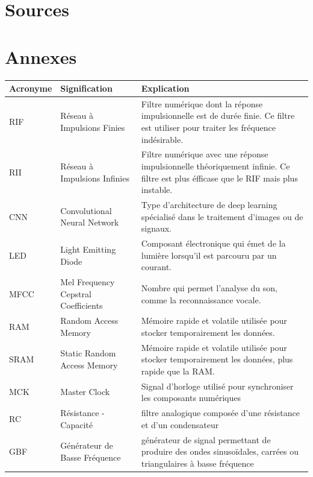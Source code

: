 \documentclass[a4paper,11pt]{article}
\begin{document}
\newpage	
\section{Sources}


\newpage

\section{Annexes}
\begin{table}[H]
\centering
\begin{tabular}{|l|p{4cm}|p{8cm}|}
\hline
\textbf{Acronyme} & \textbf{Signification} & \textbf{Explication} \\
\hline
RIF & Réseau à Impulsions Finies & Filtre numérique dont la réponse impulsionnelle est de durée finie. Ce filtre est utiliser pour traiter les fréquence indésirable. \\ 
\hline
RII & Réseau à Impulsions Infinies & Filtre numérique avec une réponse impulsionnelle théoriquement infinie. Ce filtre est plus éfficase que le RIF mais plus instable.\\
\hline
CNN & Convolutional Neural Network & Type d’architecture de deep learning spécialisé dans le traitement d’images ou de signaux.\\
\hline
LED & Light Emitting Diode & Composant électronique qui émet de la lumière lorsqu’il est parcouru par un courant. \\
\hline
MFCC & Mel Frequency Cepstral Coefficients & Nombre qui permet l’analyse du son, comme la reconnaissance vocale.\\
\hline
RAM & Random Access Memory & Mémoire rapide et volatile utilisée pour stocker temporairement les données.\\
\hline
SRAM &Static Random Access Memory & Mémoire rapide et volatile utilisée pour stocker temporairement les données, plus rapide que la RAM.\\
\hline
MCK & Master Clock & Signal d’horloge utilisé pour synchroniser les composants numériques\\
\hline
RC & Résistance - Capacité & filtre analogique composée d’une résistance et d’un condensateur\\
\hline
GBF & Générateur de Basse Fréquence & générateur de signal permettant de produire des ondes sinusoïdales, carrées ou triangulaires à basse fréquence\\

\end{tabular}
\end{table}
\end{document}
